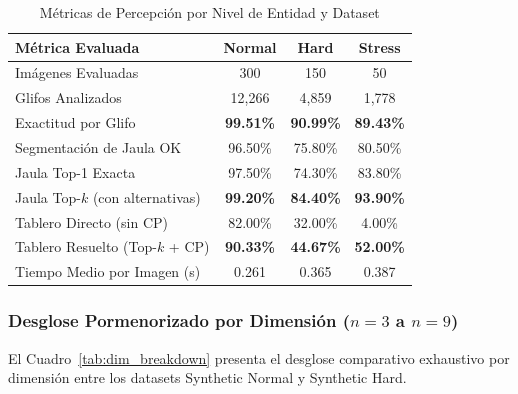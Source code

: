 \documentclass[conference]{IEEEtran}
\begin{document}
\begin{table}[htbp]
\caption{M\'etricas de Percepci\'on por Nivel de Entidad y Dataset}
\label{tab:global_metrics}
\centering
\footnotesize
\setlength{\tabcolsep}{3.0pt}
\begin{tabular}{@{}lccc@{}}
\toprule
\textbf{M\'etrica Evaluada} & \textbf{Normal} & \textbf{Hard} & \textbf{Stress} \\
\midrule
Im\'agenes Evaluadas & 300 & 150 & 50 \\
Glifos Analizados & 12{,}266 & 4{,}859 & 1{,}778 \\
Exactitud por Glifo & \textbf{99.51\%} & \textbf{90.99\%} & \textbf{89.43\%} \\
Segmentaci\'on de Jaula OK & 96.50\% & 75.80\% & 80.50\% \\
Jaula Top-1 Exacta & 97.50\% & 74.30\% & 83.80\% \\
Jaula Top-$k$ (con alternativas) & \textbf{99.20\%} & \textbf{84.40\%} & \textbf{93.90\%} \\
Tablero Directo (sin CP) & 82.00\% & 32.00\% & 4.00\% \\
Tablero Resuelto (Top-$k$ + CP) & \textbf{90.33\%} & \textbf{44.67\%} & \textbf{52.00\%} \\
Tiempo Medio por Imagen (s) & 0.261 & 0.365 & 0.387 \\
\bottomrule
\end{tabular}
\end{table}

\subsubsection{Desglose Pormenorizado por Dimensi\'on \texorpdfstring{($n=3$ a $n=9$)}{(n=3 a n=9)}}
El Cuadro~\ref{tab:dim_breakdown} presenta el desglose comparativo exhaustivo por dimensi\'on entre los datasets Synthetic Normal y Synthetic Hard.
\end{document}

